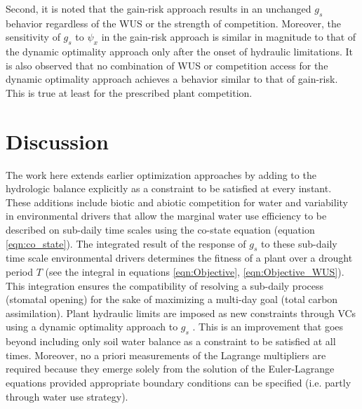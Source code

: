 \documentclass[utf8]{frontiersSCNS} %
\begin{document}
Second, it is noted that the gain-risk approach results in an unchanged $g_s$ behavior regardless of the WUS or the strength of competition. Moreover, the sensitivity of $g_s$ to $\psi_x$ in the gain-risk approach is similar in magnitude to that of the dynamic optimality approach only after the onset of hydraulic limitations. It is also observed that no combination of WUS or competition access for the dynamic optimality approach achieves a behavior similar to that of gain-risk. This is true at least for the prescribed plant competition. 

\section{Discussion}

The work here extends earlier optimization approaches by adding to the hydrologic balance explicitly as a constraint to be satisfied at every instant. These additions include biotic and abiotic competition for water and variability in environmental drivers that allow the marginal water use efficiency to be described on sub-daily time scales using the co-state equation (equation \ref{eqn:co_state}). The integrated result of the response of $g_s$ to these sub-daily time scale environmental drivers determines the fitness of a plant over a drought period $T$ (see the integral in equations \ref{eqn:Objective}, \ref{eqn:Objective_WUS}). This integration ensures the compatibility of resolving a sub-daily process (stomatal opening) for the sake of maximizing a multi-day goal (total carbon assimilation).  Plant hydraulic limits are imposed as new constraints through VCs using a dynamic optimality approach to $g_s$ \citep{manzoni_optimization_2013}. This is an improvement that goes beyond including only soil water balance as a constraint to be satisfied at all times. Moreover, no a priori measurements of the Lagrange multipliers are required because they emerge solely from the solution of the Euler-Lagrange equations \citep{witelski_variational_2015} provided appropriate boundary conditions can be specified (i.e. partly through water use strategy).
\end{document}
